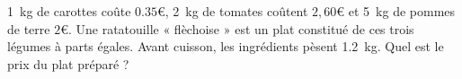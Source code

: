 
\begin{exercice}\label{exo2smath-0119}

    \SI{1}{\kilo\gram} de carottes coûte $0.35$€, \SI{2}{\kilo\gram} de tomates coûtent $2,60$€ et \SI{5}{\kilo\gram} de pommes de terre $2$€.  Une ratatouille « flèchoise » est un plat constitué de ces trois légumes à parts égales. Avant cuisson, les ingrédients pèsent \SI{1.2}{\kilo\gram}. Quel est le prix du plat préparé ?


\end{exercice}
